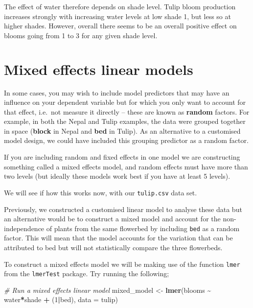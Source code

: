 \documentclass[
]{book}
\newenvironment{Shaded}{\begin{snugshade}}{\end{snugshade}}
\newcommand{\AttributeTok}[1]{\textcolor[rgb]{0.13,0.29,0.53}{#1}}
\newcommand{\CommentTok}[1]{\textcolor[rgb]{0.56,0.35,0.01}{\textit{#1}}}
\newcommand{\DecValTok}[1]{\textcolor[rgb]{0.00,0.00,0.81}{#1}}
\newcommand{\FunctionTok}[1]{\textcolor[rgb]{0.13,0.29,0.53}{\textbf{#1}}}
\newcommand{\NormalTok}[1]{#1}
\newcommand{\OtherTok}[1]{\textcolor[rgb]{0.56,0.35,0.01}{#1}}
\newcommand{\SpecialCharTok}[1]{\textcolor[rgb]{0.81,0.36,0.00}{\textbf{#1}}}
\begin{document}
The effect of water therefore depends on shade level. Tulip bloom production increases strongly with increasing water levels at low shade 1, but less so at higher shades. However, overall there seems to be an overall positive effect on blooms going from 1 to 3 for any given shade level.

\hypertarget{mixed-effects-linear-models}{%
\section{Mixed effects linear models}\label{mixed-effects-linear-models}}

In some cases, you may wish to include model predictors that may have an influence on your dependent variable but for which you only want to account for that effect, i.e.~not measure it directly -- these are known as \textbf{random} factors. For example, in both the Nepal and Tulip examples, the data were grouped together in space (\textbf{block} in Nepal and \textbf{bed} in Tulip). As an alternative to a customised model design, we could have included this grouping predictor as a random factor.

If you are including random and fixed effects in one model we are constructing something called a mixed effects model, and random effects must have more than two levels (but ideally these models work best if you have at least 5 levels).

We will see if how this works now, with our \texttt{tulip.csv} data set.

Previously, we constructed a customised linear model to analyse these data but an alternative would be to construct a mixed model and account for the non-independence of plants from the same flowerbed by including \texttt{bed} as a random factor. This will mean that the model accounts for the variation that can be attributed to bed but will not statistically compare the three flowerbeds.

To construct a mixed effects model we will be making use of the function \texttt{lmer} from the \texttt{lmerTest} package. Try running the following;

\begin{Shaded}
\begin{Highlighting}[]
\CommentTok{\# Run a mixed effects linear model}
\NormalTok{mixed\_model }\OtherTok{\textless{}{-}} \FunctionTok{lmer}\NormalTok{(blooms }\SpecialCharTok{\textasciitilde{}}\NormalTok{ water}\SpecialCharTok{*}\NormalTok{shade }\SpecialCharTok{+}\NormalTok{ (}\DecValTok{1}\SpecialCharTok{|}\NormalTok{bed), }\AttributeTok{data =}\NormalTok{ tulip)}
\end{Highlighting}
\end{Shaded}
\end{document}
